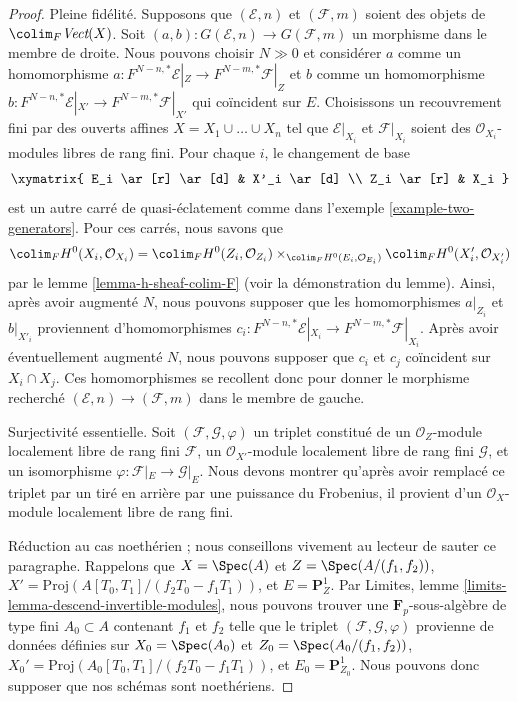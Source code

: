 \begin{proof}
Pleine fidélité. Supposons que $(\mathcal{E}, n)$ et
$(\mathcal{F}, m)$ soient des objets de $\colim_F \textit{Vect}(X)$.
Soit $(a, b) : G(\mathcal{E}, n) \to G(\mathcal{F}, m)$
un morphisme dans le membre de droite. Nous pouvons choisir $N \gg 0$ et
considérer $a$ comme un homomorphisme
$a : F^{N - n, *}\mathcal{E}|_Z \to F^{N - m, *}\mathcal{F}|_Z$
et $b$ comme un homomorphisme
$b : F^{N - n, *}\mathcal{E}|_{X'} \to F^{N - m, *}\mathcal{F}|_{X'}$
qui coïncident sur $E$.
Choisissons un recouvrement fini par des ouverts affines
$X = X_1 \cup \ldots \cup X_n$ tel que $\mathcal{E}|_{X_i}$
et $\mathcal{F}|_{X_i}$ soient des $\mathcal{O}_{X_i}$-modules libres de rang fini.
Pour chaque $i$, le changement de base
$$
\xymatrix{
E_i \ar[r] \ar[d] & X'_i \ar[d] \\
Z_i \ar[r] & X_i
}
$$
est un autre carré de quasi-éclatement comme dans l'exemple \ref{example-two-generators}.
Pour ces carrés, nous savons que
$$
\colim_F H^0(X_i, \mathcal{O}_{X_i}) =
\colim_F H^0(Z_i, \mathcal{O}_{Z_i})
\times_{\colim_F H^0(E_i, \mathcal{O}_{E_i})}
\colim_F H^0(X'_i, \mathcal{O}_{X'_i})
$$
par le lemme \ref{lemma-h-sheaf-colim-F} (voir la démonstration du lemme).
Ainsi, après avoir augmenté $N$, nous pouvons supposer que
les homomorphismes $a|_{Z_i}$ et $b|_{X'_i}$ proviennent
d'homomorphismes $c_i : F^{N - n, *}\mathcal{E}|_{X_i} \to F^{N - m, *}\mathcal{F}|_{X_i}$.
Après avoir éventuellement augmenté $N$, nous pouvons supposer que $c_i$ et $c_j$
coïncident sur $X_i \cap X_j$. Ces homomorphismes se recollent donc pour donner le
morphisme recherché $(\mathcal{E}, n) \to (\mathcal{F}, m)$
dans le membre de gauche.

\medskip\noindent
Surjectivité essentielle. Soit $(\mathcal{F}, \mathcal{G}, \varphi)$ un
triplet constitué de
un $\mathcal{O}_Z$-module localement libre de rang fini $\mathcal{F}$,
un $\mathcal{O}_{X'}$-module localement libre de rang fini $\mathcal{G}$, et
un isomorphisme $\varphi : \mathcal{F}|_E \to \mathcal{G}|_E$.
Nous devons montrer qu'après avoir remplacé ce triplet par un tiré en arrière par une
puissance du Frobenius, il provient d'un $\mathcal{O}_X$-module localement libre de rang fini.

\medskip\noindent
Réduction au cas noethérien ; nous conseillons vivement au lecteur de sauter ce paragraphe.
Rappelons que $X = \Spec(A)$ et $Z = \Spec(A/(f_1, f_2))$,
$X' = \text{Proj}(A[T_0, T_1]/(f_2T_0 - f_1T_1))$, et
$E = \mathbf{P}^1_Z$. Par Limites, lemme
\ref{limits-lemma-descend-invertible-modules},
nous pouvons trouver une $\mathbf{F}_p$-sous-algèbre de type fini
$A_0 \subset A$ contenant $f_1$ et $f_2$ telle que le triplet
$(\mathcal{F}, \mathcal{G}, \varphi)$ provienne de données définies sur
$X_0 = \Spec(A_0)$ et $Z_0 = \Spec(A_0/(f_1, f_2))$,
$X_0' = \text{Proj}(A_0[T_0, T_1]/(f_2T_0 - f_1T_1))$, et
$E_0 = \mathbf{P}^1_{Z_0}$. Nous pouvons donc supposer que nos schémas
sont noethériens.


\end{proof}
